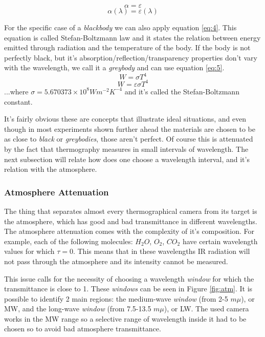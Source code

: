\begin{equation}\label{eq:2}
\alpha=\varepsilon
\end{equation}
\begin{equation}\label{eq:3}
\alpha(\lambda)=\varepsilon(\lambda)
\end{equation}
\par For the specific case of a \textit{blackbody} we can also apply equation \ref{eq:4}. This equation is called Stefan-Boltzmann law and it states the relation between energy emitted through radiation and the temperature of the body. If the body is not perfectly black, but it's absorption/reflection/transparency properties don't vary with the wavelength, we call it a \textit{greybody} and can use equation \ref{eq:5}.
\begin{equation}\label{eq:4}
W=\sigma T^4
\end{equation}
\begin{equation}\label{eq:5}
W=\varepsilon \sigma T^4
\end{equation}
...where $\sigma=5.670373 \times 10^8 W m^{-2} K^{-4}$ and it's called the Stefan-Boltzmann constant.\\
\par It's fairly obvious these are concepts that illustrate ideal situations, and even though in most experiments shown further ahead the materials are chosen to be as close to \textit{black} or \textit{greybodies}, those aren't perfect. Of course this is attenuated by the fact that thermography measures in small intervals of wavelength. The next subsection will relate how does one choose a wavelength interval, and it's relation with the atmosphere.

\subsubsection{Atmosphere Attenuation}
\label{subsec:atmat}

\par The thing that separates almost every thermographical camera from its target is the atmosphere, which has good and bad transmittance in different wavelengths. The atmosphere attenuation comes with the complexity of it's composition. For example, each of the following molecules: $H_2O$, $O_2$, $CO_2$ have certain wavelength values for which $\tau=0$. This means that in these wavelengths IR radiation will not pass through the atmosphere and its intensity cannot be measured.\\
\par This issue calls for the necessity of choosing a wavelength \textit{window} for which the transmittance is close to 1. These \textit{windows} can be seen in Figure \ref{fig:atm}. It is possible to identify 2 main regions: the medium-wave \textit{window} (from 2-5 $m \mu$), or MW, and the long-wave \textit{window} (from 7.5-13.5 $m \mu$), or LW. The used camera works in the MW range so a selective range of wavelength inside it had to be chosen so to avoid bad atmosphere transmittance.

